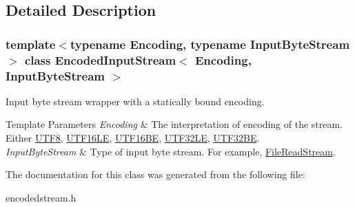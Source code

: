 \subsection{Detailed Description}
\subsubsection*{template$<$typename Encoding, typename Input\+Byte\+Stream$>$\newline
class Encoded\+Input\+Stream$<$ Encoding, Input\+Byte\+Stream $>$}

Input byte stream wrapper with a statically bound encoding. 


\begin{DoxyTemplParams}{Template Parameters}
{\em Encoding} & The interpretation of encoding of the stream. Either \hyperlink{a02144}{U\+T\+F8}, \hyperlink{a02152}{U\+T\+F16\+LE}, \hyperlink{a02156}{U\+T\+F16\+BE}, \hyperlink{a02164}{U\+T\+F32\+LE}, \hyperlink{a02168}{U\+T\+F32\+BE}. \\
\hline
{\em Input\+Byte\+Stream} & Type of input byte stream. For example, \hyperlink{a02192}{File\+Read\+Stream}. \\
\hline
\end{DoxyTemplParams}


The documentation for this class was generated from the following file\+:\begin{DoxyCompactItemize}
\item 
encodedstream.\+h\end{DoxyCompactItemize}
